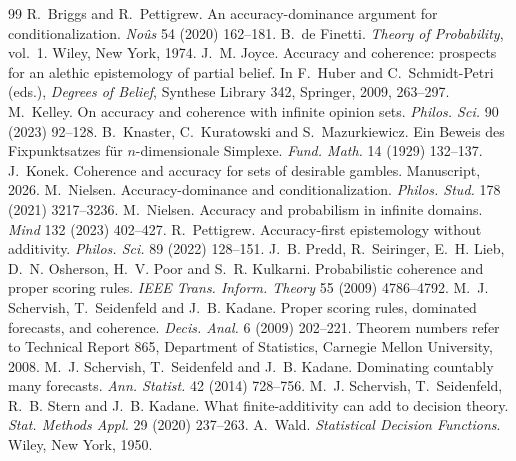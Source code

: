 \documentclass[11pt]{article}
\theoremstyle{definition}
\theoremstyle{remark}
\begin{document}
\begin{thebibliography}{99}
 R.~Briggs and R.~Pettigrew. An accuracy-dominance argument for conditionalization. \emph{No\^us} 54 (2020) 162--181.
 B.~de Finetti. \emph{Theory of Probability}, vol.~1. Wiley, New York, 1974.
 J.~M. Joyce. Accuracy and coherence: prospects for an alethic epistemology of partial belief. In F.~Huber and C.~Schmidt-Petri (eds.), \emph{Degrees of Belief}, Synthese Library 342, Springer, 2009, 263--297.
 M.~Kelley. On accuracy and coherence with infinite opinion sets. \emph{Philos. Sci.} 90 (2023) 92--128.
 B.~Knaster, C.~Kuratowski and S.~Mazurkiewicz. Ein Beweis des Fixpunktsatzes f\"ur $n$-dimensionale Simplexe. \emph{Fund. Math.} 14 (1929) 132--137.
 J.~Konek. Coherence and accuracy for sets of desirable gambles. Manuscript, 2026.
 M.~Nielsen. Accuracy-dominance and conditionalization. \emph{Philos. Stud.} 178 (2021) 3217--3236.
 M.~Nielsen. Accuracy and probabilism in infinite domains. \emph{Mind} 132 (2023) 402--427.
 R.~Pettigrew. Accuracy-first epistemology without additivity. \emph{Philos. Sci.} 89 (2022) 128--151.
 J.~B. Predd, R.~Seiringer, E.~H. Lieb, D.~N. Osherson, H.~V. Poor and S.~R. Kulkarni. Probabilistic coherence and proper scoring rules. \emph{IEEE Trans. Inform. Theory} 55 (2009) 4786--4792.
 M.~J. Schervish, T.~Seidenfeld and J.~B. Kadane. Proper scoring rules, dominated forecasts, and coherence. \emph{Decis. Anal.} 6 (2009) 202--221. Theorem numbers refer to Technical Report 865, Department of Statistics, Carnegie Mellon University, 2008.
 M.~J. Schervish, T.~Seidenfeld and J.~B. Kadane. Dominating countably many forecasts. \emph{Ann. Statist.} 42 (2014) 728--756.
 M.~J. Schervish, T.~Seidenfeld, R.~B. Stern and J.~B. Kadane. What finite-additivity can add to decision theory. \emph{Stat. Methods Appl.} 29 (2020) 237--263.
 A.~Wald. \emph{Statistical Decision Functions}. Wiley, New York, 1950.
\end{thebibliography}
\end{document}
